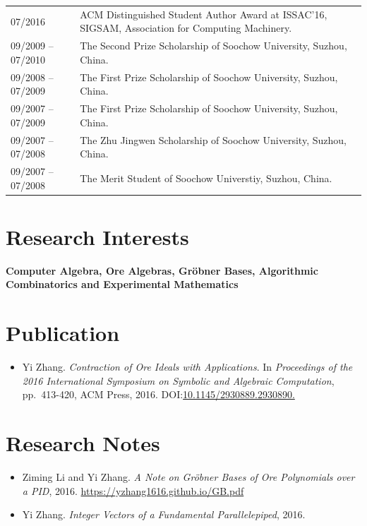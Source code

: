 \documentclass[a4paper,12pt]{article}
\begin{document}
\begin{tabular}{@{}p{1.4in}p{4in}}
07/2016               & ACM Distinguished Student Author Award at ISSAC'16, SIGSAM, Association for Computing Machinery. \\
09/2009 -- 07/2010    & The Second Prize Scholarship of Soochow University, Suzhou, China.\\
09/2008 -- 07/2009    & The First Prize Scholarship of Soochow University, Suzhou, China. \\
09/2007 -- 07/2009    & The First Prize Scholarship of Soochow University, Suzhou, China. \\ 
09/2007 -- 07/2008    & The Zhu Jingwen Scholarship of Soochow University, Suzhou, China. \\
09/2007 -- 07/2008    & The Merit Student of Soochow Universtiy, Suzhou, China. 
\end{tabular}

\section*{\Large{Research Interests}}
{\bf Computer Algebra, Ore Algebras, Gr\"{o}bner Bases, Algorithmic Combinatorics and Experimental Mathematics}

\section*{\Large{Publication}}
\begin{itemize}
 \item Yi Zhang. {\em Contraction of Ore Ideals with Applications}. 
       In {\em Proceedings of the 2016 International Symposium on Symbolic and Algebraic Computation}, 
       pp.\ 413-420, ACM Press, 2016. DOI:\href{http://dl.acm.org/citation.cfm?id=2930890}{10.1145/2930889.2930890.}
\end{itemize}

\section*{\Large{Research Notes}}
\begin{itemize}
 \item Ziming Li and Yi Zhang. {\em A Note on Gr\"{o}bner Bases of Ore Polynomials over a PID}, 2016. 
 \url{https://yzhang1616.github.io/GB.pdf} 
 \item Yi Zhang. {\em Integer Vectors of a Fundamental Parallelepiped}, 2016.
\end{itemize}
\end{document}
